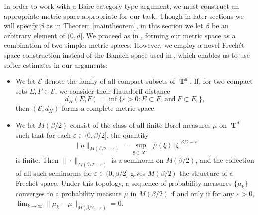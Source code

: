 \documentclass[12pt,reqno]{article}
\numberwithin{equation}{section}
\DeclareMathOperator{\ZZ}{\mathbf{Z}}
\DeclareMathOperator{\TT}{\mathbf{T}}
\begin{document}
In order to work with a Baire category type argument, we must construct an appropriate metric space appropriate for our task. Though in later sections we will specify $\beta$ as in Theorem \ref{maintheorem}, in this section we let $\beta$ be an arbitrary element of $(0,d]$. We proceed as in \cite{Korner2}, forming our metric space as a combination of two simpler metric spaces. However, we employ a novel Frech\'{e}t space construction instead of the Banach space used in \cite{Korner2}, which enables us to use softer estimates in our arguments:
%
\begin{itemize}
    \item We let $\mathcal{E}$ denote the family of all compact subsets of $\TT^d$. If, for two compact sets $E,F \in \mathcal{E}$, we consider their Hausdorff distance
    \[ d_H(E,F) = \inf \{ \varepsilon > 0 : E \subset F_\varepsilon\ \text{and}\ F \subset E_\varepsilon \}, \]
    then $(\mathcal{E},d_H)$ forms a complete metric space. %

    \item We let $M(\beta/2)$ consist of the class of all finite Borel measures $\mu$ on $\TT^d$ such that for each $\varepsilon \in (0,\beta/2]$, the quantity
    \[ \| \mu \|_{M(\beta/2 - \varepsilon)} = \sup_{\xi \in \ZZ^d} |\widehat{\mu}(\xi)| |\xi|^{\beta/2 - \varepsilon} \]
    is finite. Then $\| \cdot \|_{M(\beta/2 - \varepsilon)}$ is a seminorm on $M(\beta/2)$, and the collection of all such seminorms for $\varepsilon \in (0,\beta/2]$ gives $M(\beta/2)$ the structure of a Frech\'{e}t space. Under this topology, a sequence of probability measures $\{ \mu_k \}$ converges to a probability measure $\mu$ in $M(\beta/2)$ if and only if for any $\varepsilon > 0$, $\lim_{k \to \infty} \| \mu_k - \mu \|_{M(\beta/2 - \varepsilon)} = 0$.
\end{itemize}
\end{document}
